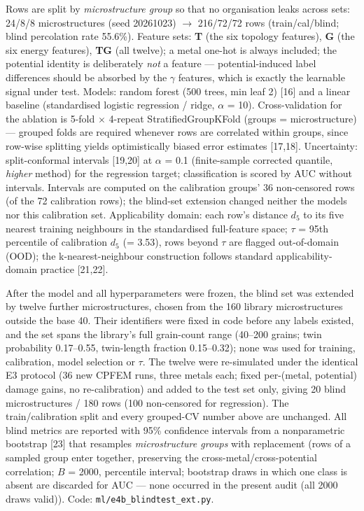 \documentclass[11pt]{article}
\begin{document}
Rows are split by \textit{microstructure group} so that no organisation leaks across sets: 24/8/8 microstructures (seed 20261023) $\rightarrow$ 216/72/72 rows (train/cal/blind; blind percolation rate 55.6\%). Feature sets: \textbf{T} (the six topology features), \textbf{G} (the six energy features), \textbf{TG} (all twelve); a metal one-hot is always included; the potential identity is deliberately \textit{not} a feature --- potential-induced label differences should be absorbed by the $\gamma$ features, which is exactly the learnable signal under test. Models: random forest (500 trees, min leaf 2) [16] and a linear baseline (standardised logistic regression / ridge, $\alpha$ = 10). Cross-validation for the ablation is 5-fold $\times$ 4-repeat StratifiedGroupKFold (groups = microstructure) --- grouped folds are required whenever rows are correlated within groups, since row-wise splitting yields optimistically biased error estimates [17,18]. Uncertainty: split-conformal intervals [19,20] at $\alpha$ = 0.1 (finite-sample corrected quantile, \textit{higher} method) for the regression target; classification is scored by AUC without intervals. Intervals are computed on the calibration groups' 36 non-censored rows (of the 72 calibration rows); the blind-set extension changed neither the models nor this calibration set. Applicability domain: each row's distance $d_5$ to its five nearest training neighbours in the standardised full-feature space; $\tau$ = 95th percentile of calibration $d_5$ (= 3.53), rows beyond $\tau$ are flagged out-of-domain (OOD); the k-nearest-neighbour construction follows standard applicability-domain practice [21,22].

After the model and all hyperparameters were frozen, the blind set was extended by twelve further microstructures, chosen from the 160 library microstructures outside the base 40. Their identifiers were fixed in code before any labels existed, and the set spans the library's full grain-count range (40--200 grains; twin probability 0.17--0.55, twin-length fraction 0.15--0.32); none was used for training, calibration, model selection or $\tau$. The twelve were re-simulated under the identical E3 protocol (36 new CPFEM runs, three metals each; fixed per-(metal, potential) damage gains, no re-calibration) and added to the test set only, giving 20 blind microstructures / 180 rows (100 non-censored for regression). The train/calibration split and every grouped-CV number above are unchanged. All blind metrics are reported with 95\% confidence intervals from a nonparametric bootstrap [23] that resamples \textit{microstructure groups} with replacement (rows of a sampled group enter together, preserving the cross-metal/cross-potential correlation; $B$ = 2000, percentile interval; bootstrap draws in which one class is absent are discarded for AUC --- none occurred in the present audit (all 2000 draws valid)). Code: \texttt{ml/e4b\_blindtest\_ext.py}.
\end{document}
